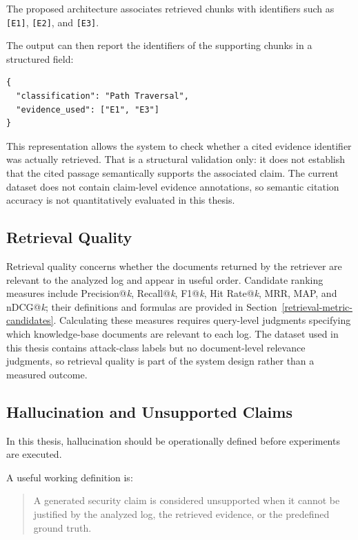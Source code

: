 The proposed architecture associates retrieved chunks with identifiers
such as \texttt{[E1]}, \texttt{[E2]}, and \texttt{[E3]}.

The output can then report the identifiers of the supporting chunks in a
structured field:

\begin{lstlisting}
{
  "classification": "Path Traversal",
  "evidence_used": ["E1", "E3"]
}
\end{lstlisting}

This representation allows the system to check whether a cited evidence
identifier was actually retrieved. That is a structural validation only:
it does not establish that the cited passage semantically supports the
associated claim. The current dataset does not contain claim-level
evidence annotations, so semantic citation accuracy is not quantitatively
evaluated in this thesis.

\subsection{Retrieval Quality}\label{retrieval-quality}

Retrieval quality concerns whether the documents returned by the
retriever are relevant to the analyzed log and appear in useful order.
Candidate ranking measures include Precision@\emph{k}, Recall@\emph{k},
F1@\emph{k}, Hit Rate@\emph{k}, MRR, MAP, and nDCG@\emph{k}; their
definitions and formulas are provided in
Section~\ref{retrieval-metric-candidates}. Calculating these measures
requires query-level judgments specifying which knowledge-base documents
are relevant to each log. The dataset used in this thesis contains
attack-class labels but no document-level relevance judgments, so
retrieval quality is part of the system design rather than a measured
outcome.

\subsection{Hallucination and Unsupported
Claims}\label{hallucination-and-unsupported-claims}

In this thesis, hallucination should be operationally defined before
experiments are executed.

A useful working definition is:

\begin{quote}
A generated security claim is considered unsupported when it cannot be
justified by the analyzed log, the retrieved evidence, or the predefined
ground truth.
\end{quote}

